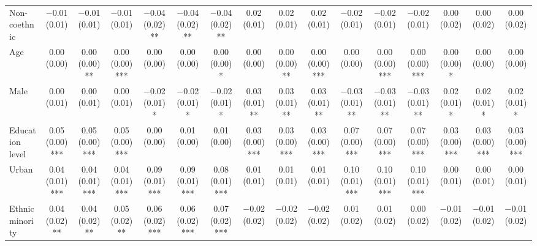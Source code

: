\begin{table}
\begin{tabular}[t]{lccccccccccccccc}
Non-coethnic & \num{-0.01} (\num{0.01}) & \num{-0.01} (\num{0.01}) & \num{-0.01} (\num{0.01}) & \num{-0.04} (\num{0.02})** & \num{-0.04} (\num{0.02})** & \num{-0.04} (\num{0.02})** & \num{0.02} (\num{0.01}) & \num{0.02} (\num{0.01}) & \num{0.02} (\num{0.01}) & \num{-0.02} (\num{0.01}) & \num{-0.02} (\num{0.01}) & \num{-0.02} (\num{0.01}) & \num{0.00} (\num{0.02}) & \num{0.00} (\num{0.02}) & \num{0.00} (\num{0.02})\\
Age & \num{0.00} (\num{0.00}) & \num{0.00} (\num{0.00})** & \num{0.00} (\num{0.00})*** & \num{0.00} (\num{0.00}) & \num{0.00} (\num{0.00}) & \num{0.00} (\num{0.00})* & \num{0.00} (\num{0.00}) & \num{0.00} (\num{0.00})** & \num{0.00} (\num{0.00})*** & \num{0.00} (\num{0.00}) & \num{0.00} (\num{0.00})*** & \num{0.00} (\num{0.00})*** & \num{0.00} (\num{0.00})* & \num{0.00} (\num{0.00}) & \num{0.00} (\num{0.00})\\
Male & \num{0.00} (\num{0.01}) & \num{0.00} (\num{0.01}) & \num{0.00} (\num{0.01}) & \num{-0.02} (\num{0.01})* & \num{-0.02} (\num{0.01})* & \num{-0.02} (\num{0.01})* & \num{0.03} (\num{0.01})** & \num{0.03} (\num{0.01})** & \num{0.03} (\num{0.01})** & \num{-0.03} (\num{0.01})** & \num{-0.03} (\num{0.01})** & \num{-0.03} (\num{0.01})** & \num{0.02} (\num{0.01})* & \num{0.02} (\num{0.01})* & \num{0.02} (\num{0.01})*\\
Education level & \num{0.05} (\num{0.00})*** & \num{0.05} (\num{0.00})*** & \num{0.05} (\num{0.00})*** & \num{0.00} (\num{0.00}) & \num{0.01} (\num{0.00}) & \num{0.01} (\num{0.00}) & \num{0.03} (\num{0.00})*** & \num{0.03} (\num{0.00})*** & \num{0.03} (\num{0.00})*** & \num{0.07} (\num{0.00})*** & \num{0.07} (\num{0.00})*** & \num{0.07} (\num{0.00})*** & \num{0.03} (\num{0.00})*** & \num{0.03} (\num{0.00})*** & \num{0.03} (\num{0.00})***\\
Urban & \num{0.04} (\num{0.01})*** & \num{0.04} (\num{0.01})*** & \num{0.04} (\num{0.01})*** & \num{0.09} (\num{0.01})*** & \num{0.09} (\num{0.01})*** & \num{0.08} (\num{0.01})*** & \num{0.01} (\num{0.01}) & \num{0.01} (\num{0.01}) & \num{0.01} (\num{0.01}) & \num{0.10} (\num{0.01})*** & \num{0.10} (\num{0.01})*** & \num{0.10} (\num{0.01})*** & \num{0.00} (\num{0.01}) & \num{0.00} (\num{0.01}) & \num{0.00} (\num{0.01})\\
Ethnic minority & \num{0.04} (\num{0.02})** & \num{0.04} (\num{0.02})** & \num{0.05} (\num{0.02})** & \num{0.06} (\num{0.02})*** & \num{0.06} (\num{0.02})*** & \num{0.07} (\num{0.02})*** & \num{-0.02} (\num{0.02}) & \num{-0.02} (\num{0.02}) & \num{-0.02} (\num{0.02}) & \num{0.01} (\num{0.02}) & \num{0.01} (\num{0.02}) & \num{0.00} (\num{0.02}) & \num{-0.01} (\num{0.02}) & \num{-0.01} (\num{0.02}) & \num{-0.01} (\num{0.02})\\

\end{tabular}
\end{table}
